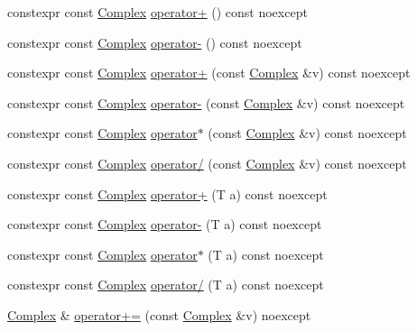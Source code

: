 \begin{DoxyCompactItemize}
\item 
constexpr const \mbox{\hyperlink{structmage_1_1_complex}{Complex}} \mbox{\hyperlink{structmage_1_1_complex_a90b404523f27f255ff44f9e19ed9c9b4}{operator+}} () const noexcept
\item 
constexpr const \mbox{\hyperlink{structmage_1_1_complex}{Complex}} \mbox{\hyperlink{structmage_1_1_complex_a921d25c86b2e820c711841d96f0b2576}{operator-\/}} () const noexcept
\item 
constexpr const \mbox{\hyperlink{structmage_1_1_complex}{Complex}} \mbox{\hyperlink{structmage_1_1_complex_a97455a61c533f667cf9127a204dc16b4}{operator+}} (const \mbox{\hyperlink{structmage_1_1_complex}{Complex}} \&v) const noexcept
\item 
constexpr const \mbox{\hyperlink{structmage_1_1_complex}{Complex}} \mbox{\hyperlink{structmage_1_1_complex_aa33adb258ed9e501040ff923ee75e4b1}{operator-\/}} (const \mbox{\hyperlink{structmage_1_1_complex}{Complex}} \&v) const noexcept
\item 
constexpr const \mbox{\hyperlink{structmage_1_1_complex}{Complex}} \mbox{\hyperlink{structmage_1_1_complex_ace045f385ad18786576a556d63f4a64d}{operator$\ast$}} (const \mbox{\hyperlink{structmage_1_1_complex}{Complex}} \&v) const noexcept
\item 
constexpr const \mbox{\hyperlink{structmage_1_1_complex}{Complex}} \mbox{\hyperlink{structmage_1_1_complex_a097109a637f77e6eeae0e6e22002578c}{operator/}} (const \mbox{\hyperlink{structmage_1_1_complex}{Complex}} \&v) const noexcept
\item 
constexpr const \mbox{\hyperlink{structmage_1_1_complex}{Complex}} \mbox{\hyperlink{structmage_1_1_complex_a4eec18bc848f0b50326d30f91ac98a26}{operator+}} (T a) const noexcept
\item 
constexpr const \mbox{\hyperlink{structmage_1_1_complex}{Complex}} \mbox{\hyperlink{structmage_1_1_complex_a98b611f0ee4781f182049cbb68306972}{operator-\/}} (T a) const noexcept
\item 
constexpr const \mbox{\hyperlink{structmage_1_1_complex}{Complex}} \mbox{\hyperlink{structmage_1_1_complex_a2165764efc8953ad4223dbc2c44813e9}{operator$\ast$}} (T a) const noexcept
\item 
constexpr const \mbox{\hyperlink{structmage_1_1_complex}{Complex}} \mbox{\hyperlink{structmage_1_1_complex_a79e60c33582d854aaa36d58049d3498e}{operator/}} (T a) const noexcept
\item 
\mbox{\hyperlink{structmage_1_1_complex}{Complex}} \& \mbox{\hyperlink{structmage_1_1_complex_a8571adf555e98ae78d6d4549306b95d6}{operator+=}} (const \mbox{\hyperlink{structmage_1_1_complex}{Complex}} \&v) noexcept

\end{DoxyCompactItemize}
